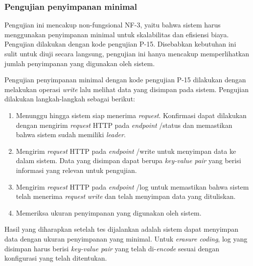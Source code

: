 \subsubsection{Pengujian penyimpanan minimal}
\label{subsubsection:pengujian-penyimpanan-minimal}

Pengujian ini mencakup non-fungsional NF-3, yaitu bahwa sistem harus menggunakan penyimpanan minimal untuk skalabilitas dan efisiensi biaya. Pengujian dilakukan dengan kode pengujian P-15. Disebabkan kebutuhan ini sulit untuk diuji secara langsung, pengujian ini hanya mencakup memperlihatkan jumlah penyimpanan yang digunakan oleh sistem.

Pengujian penyimpanan minimal dengan kode pengujian P-15 dilakukan dengan melakukan operasi \textit{write} lalu melihat data yang disimpan pada sistem. Pengujian dilakukan langkah-langkah sebagai berikut:

\begin{enumerate}
  \item Menunggu hingga sistem siap menerima \textit{request}. Konfirmasi dapat dilakukan dengan mengirim \textit{request} HTTP pada \textit{endpoint} /status dan memastikan bahwa sistem sudah memiliki \textit{leader}.
  \item Mengirim \textit{request} HTTP pada \textit{endpoint} /write untuk menyimpan data ke dalam sistem. Data yang disimpan dapat berupa \textit{key-value pair} yang berisi informasi yang relevan untuk pengujian.
  \item Mengirim \textit{request} HTTP pada \textit{endpoint} /log untuk memastikan bahwa sistem telah menerima \textit{request} \textit{write} dan telah menyimpan data yang dituliskan.
  \item Memeriksa ukuran penyimpanan yang digunakan oleh sistem.
\end{enumerate}

Hasil yang diharapkan setelah tes dijalankan adalah sistem dapat menyimpan data dengan ukuran penyimpanan yang minimal. Untuk \textit{erasure coding}, log yang disimpan harus berisi \textit{key-value pair} yang telah di-\textit{encode} sesuai dengan konfigurasi yang telah ditentukan.